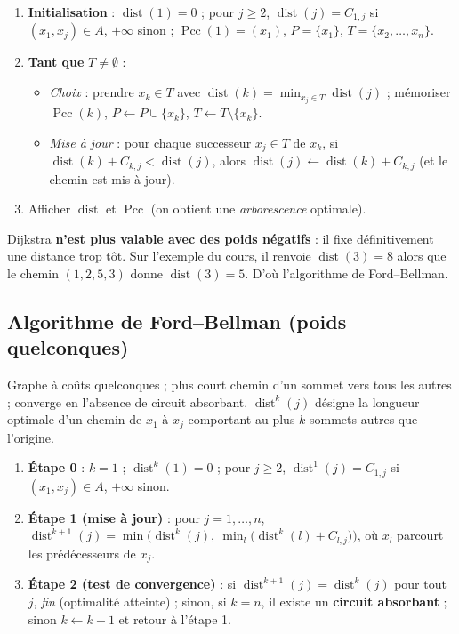\documentclass[11pt,a4paper]{article}
\newcommand{\Pcc}{\operatorname{Pcc}}
\newcommand{\dist}{\operatorname{dist}}
\begin{document}
\begin{algo}
\begin{enumerate}[nosep]
\item \textbf{Initialisation} : $\dist(1)=0$ ; pour $j\ge2$, $\dist(j)=C_{1,j}$ si $(x_1,x_j)\in A$, $+\infty$ sinon ; $\Pcc(1)=(x_1)$, $P=\{x_1\}$, $T=\{x_2,\dots,x_n\}$.
\item \textbf{Tant que} $T\ne\emptyset$ :
  \begin{itemize}[nosep]
  \item \emph{Choix} : prendre $x_k\in T$ avec $\dist(k)=\min_{x_j\in T}\dist(j)$ ; mémoriser $\Pcc(k)$, $P\leftarrow P\cup\{x_k\}$, $T\leftarrow T\setminus\{x_k\}$.
  \item \emph{Mise à jour} : pour chaque successeur $x_j\in T$ de $x_k$, si $\dist(k)+C_{k,j}<\dist(j)$, alors $\dist(j)\leftarrow\dist(k)+C_{k,j}$ (et le chemin est mis à jour).
  \end{itemize}
\item Afficher $\dist$ et $\Pcc$ (on obtient une \emph{arborescence} optimale).
\end{enumerate}
\end{algo}

\begin{retenir}
Dijkstra \textbf{n'est plus valable avec des poids négatifs} : il fixe définitivement une distance trop tôt. Sur l'exemple du cours, il renvoie $\dist(3)=8$ alors que le chemin $(1,2,5,3)$ donne $\dist(3)=5$. D'où l'algorithme de Ford--Bellman.
\end{retenir}

\subsection{Algorithme de Ford--Bellman (poids quelconques)}
Graphe à coûts quelconques ; plus court chemin d'un sommet vers tous les autres ; converge en l'absence de circuit absorbant. $\dist^k(j)$ désigne la longueur optimale d'un chemin de $x_1$ à $x_j$ comportant au plus $k$ sommets autres que l'origine.

\begin{algo}
\begin{enumerate}[nosep]
\item \textbf{Étape 0} : $k=1$ ; $\dist^k(1)=0$ ; pour $j\ge2$, $\dist^1(j)=C_{1,j}$ si $(x_1,x_j)\in A$, $+\infty$ sinon.
\item \textbf{Étape 1 (mise à jour)} : pour $j=1,\dots,n$, $\displaystyle\dist^{k+1}(j)=\min\Big(\dist^k(j),\ \min_{l}\big(\dist^k(l)+C_{l,j}\big)\Big)$, où $x_l$ parcourt les prédécesseurs de $x_j$.
\item \textbf{Étape 2 (test de convergence)} : si $\dist^{k+1}(j)=\dist^k(j)$ pour tout $j$, \emph{fin} (optimalité atteinte) ; sinon, si $k=n$, il existe un \textbf{circuit absorbant} ; sinon $k\leftarrow k+1$ et retour à l'étape 1.
\end{enumerate}
\end{algo}
\end{document}

